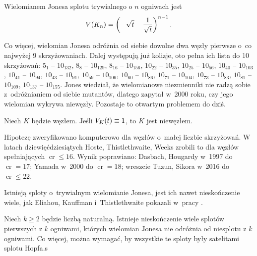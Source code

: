 \begin{proposition}
    \label{prp:jones_trivial_link}
    Wielomianem Jonesa splotu trywialnego o $n$ ogniwach jest
    \begin{equation}
        V(K_n) = \left(-\sqrt{t} - \frac{1}{\sqrt {t}}\right)^{n-1}.
    \end{equation}
\end{proposition}

Co więcej, wielomian Jonesa odróżnia od siebie dowolne dwa węzły pierwsze o~co najwyżej 9 skrzyżowaniach.
Dalej występują już kolizje, oto pełna ich lista do 10 skrzyżowań:
$5_{1}$ -- $10_{132}$,
$8_{8}$ -- $10_{129}$,
$8_{16}$ -- $10_{156}$,
$10_{22}$ -- $10_{35}$,
$10_{25}$ -- $10_{56}$,
$10_{40}$ -- $10_{103}$,
$10_{41}$ -- $10_{94}$,
$10_{43}$ -- $10_{91}$,
$10_{59}$ -- $10_{106}$,
$10_{60}$ -- $10_{86}$,
$10_{71}$ -- $10_{104}$,
$10_{73}$ -- $10_{83}$,
$10_{81}$ -- $10_{109}$,
$10_{137}$ -- $10_{155}$.
Jones wiedział, że wielomianowe niezmienniki nie radzą sobie z~odróżnianiem od siebie mutantów, dlatego zapytał w~2000 roku, czy jego wielomian wykrywa niewęzły.
Pozostaje to otwartym problemem do dziś.

\begin{conjecture}
    \label{con:jones}
    Niech $K$ będzie węzłem.
    Jeśli $V_K(t) \equiv 1$, to $K$ jest niewęzłem.
\end{conjecture}

Hipotezę zweryfikowano komputerowo dla węzłów o~małej liczbie skrzyżowań.
W latach dziewięćdziesiątych Hoste, Thistlethwaite, Weeks zrobili to dla węzłów spełniających $\operatorname{cr} \le 16$.
Wynik poprawiano: Dasbach, Hougardy w~1997 do $\operatorname{cr} = 17$; Yamada w~2000 do $\operatorname{cr} = 18$; wreszcie Tuzun, Sikora w~2016 do $\operatorname{cr} \le 22$.


Istnieją sploty o~trywialnym wielomianie Jonesa, jest ich nawet nieskończenie wiele, jak Eliahou, Kauffman i~Thistlethwaite pokazali w~pracy \cite{eliahou03}.

\begin{proposition}
    Niech $k \ge 2$ będzie liczbą naturalną.
    Istnieje nieskończenie wiele splotów pierwszych z $k$ ogniwami, których wielomian Jonesa nie odróżnia od niesplotu z $k$ ogniwami.
    Co więcej, można wymagać, by wszystkie te sploty były satelitami splotu Hopfa.s
\end{proposition}

